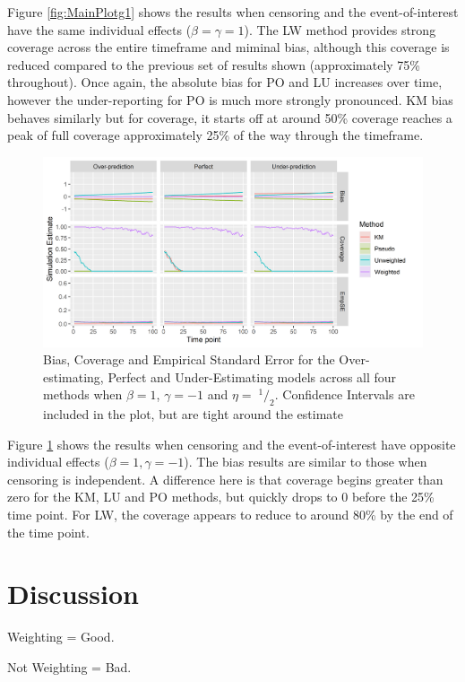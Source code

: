 \documentclass[12pt,PhD,twoside,openright]{muthesis}
\newcommand{\sfrac}[2]{\;^{#1}/_{#2}}
\begin{document}
Figure \ref{fig:MainPlotg1} shows the results when censoring and the event-of-interest have the same individual effects (\(\beta=\gamma=1\)). The LW method provides strong coverage across the entire timeframe and miminal bias, although this coverage is reduced compared to the previous set of results shown (approximately 75\% throughout). Once again, the absolute bias for PO and LU increases over time, however the under-reporting for PO is much more strongly pronounced. KM bias behaves similarly but for coverage, it starts off at around 50\% coverage reaches a peak of full coverage approximately 25\% of the way through the timeframe.
\begin{figure}
\includegraphics[width=54.68in]{figure/IPCW_Logistic/MainPlot_b(1)_g(-1)_e(0.5)} \caption{Bias, Coverage and Empirical Standard Error for the Over-estimating, Perfect and Under-Estimating models across all four methods when $\beta=1$, $\gamma=-1$ and $\eta=\sfrac{1}{2}$. Confidence Intervals are included in the plot, but are tight around the estimate}\label{fig:MainPlotg2}
\end{figure}
Figure \ref{fig:MainPlotg2} shows the results when censoring and the event-of-interest have opposite individual effects (\(\beta=1, \gamma=-1\)). The bias results are similar to those when censoring is independent. A difference here is that coverage begins greater than zero for the KM, LU and PO methods, but quickly drops to 0 before the 25\% time point. For LW, the coverage appears to reduce to around 80\% by the end of the time point.

\hypertarget{discussion-2}{%
\section{Discussion}\label{discussion-2}}

Weighting = Good.

Not Weighting = Bad.
\end{document}
